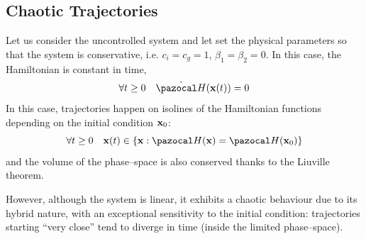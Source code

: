 \subsection{Chaotic Trajectories}
Let us consider the uncontrolled system and let set the physical parameters so that the system is conservative, i.e. $c_i = c_g = 1$, $\beta_1=\beta_2=0$. In this case, the Hamiltonian is constant in time,
%
\begin{equation}
    \forall t\geq 0 \quad \dot{\Ha}(\xb(t)) = 0
\end{equation}
%
In this case, trajectories happen on isolines of the Hamiltonian functions depending on the initial condition $\mathbf{x}_0$:
%
\begin{equation}
    \forall t\geq 0 \quad \xb(t)\in\left\{\xb:\Ha(\xb) = \Ha(\x_0)\right\}
\end{equation}
%
and the volume of the phase--space is also conserved thanks to the Liuville theorem.
%

However, although the system is linear, it exhibits a chaotic behaviour due to its hybrid nature, with an exceptional sensitivity to the initial condition: trajectories starting ``very close'' tend to diverge in time (inside the limited phase--space).
%

